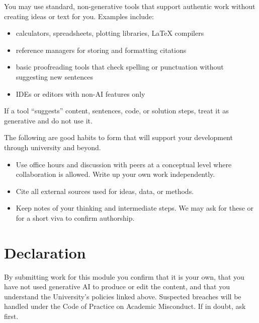 \documentclass[
  a4paper,
  DIV=11,
  numbers=noendperiod,
  oneside]{scrreprt}
\providecommand{\tightlist}{%
  \setlength{\itemsep}{0pt}\setlength{\parskip}{0pt}}
\begin{document}
You may use standard, non-generative tools that support authentic work
without creating ideas or text for you. Examples include:

\begin{itemize}
\tightlist
\item
  calculators, spreadsheets, plotting libraries, LaTeX compilers
\item
  reference managers for storing and formatting citations
\item
  basic proofreading tools that check spelling or punctuation without
  suggesting new sentences
\item
  IDEs or editors with non-AI features only
\end{itemize}

If a tool ``suggests'' content, sentences, code, or solution steps,
treat it as generative and do not use it.

\begin{tcolorbox}[enhanced jigsaw, opacitybacktitle=0.6, colframe=quarto-callout-tip-color-frame, bottomrule=.15mm, coltitle=black, colback=white, title=\textcolor{quarto-callout-tip-color}{\faLightbulb}\hspace{0.5em}{Getting help the right way}, breakable, toptitle=1mm, arc=.35mm, left=2mm, opacityback=0, rightrule=.15mm, bottomtitle=1mm, colbacktitle=quarto-callout-tip-color!10!white, toprule=.15mm, leftrule=.75mm, titlerule=0mm]

The following are good habits to form that will support your development
through university and beyond.

\begin{itemize}
\tightlist
\item
  Use office hours and discussion with peers at a conceptual level where
  collaboration is allowed. Write up your own work independently.
\item
  Cite all external sources used for ideas, data, or methods.
\item
  Keep notes of your thinking and intermediate steps. We may ask for
  these or for a short viva to confirm authorship.
\end{itemize}

\end{tcolorbox}

\section{Declaration}\label{declaration}

By submitting work for this module you confirm that it is your own, that
you have not used generative AI to produce or edit the content, and that
you understand the University's policies linked above. Suspected
breaches will be handled under the Code of Practice on Academic
Misconduct. If in doubt, ask first.
\end{document}
